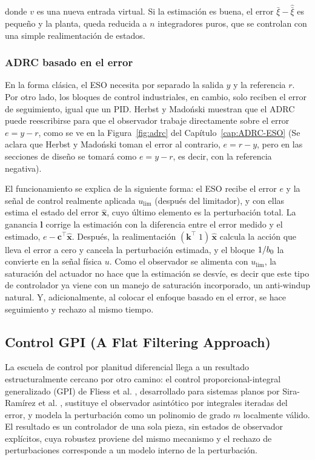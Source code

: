 donde $v$ es una nueva entrada virtual. Si la estimación es buena, el error
$\bar{\xi}-\hat{\bar{\xi}}$ es pequeño y la planta, queda reducida a
$n$ integradores puros, que se controlan con una simple realimentación de
estados.

\subsubsection*{ADRC basado en el error}

En la forma clásica, el ESO necesita por separado la salida $y$ y la
referencia $r$. Por otro lado, los bloques de control industriales, en cambio, solo
reciben el error de seguimiento, igual que un PID. Herbst y Madoński
\cite{herbst2024adrc} muestran que el ADRC puede reescribirse para que el
observador trabaje directamente sobre el error $e = y - r$, como se ve en la
Figura~\ref{fig:adrc} del Capítulo~\ref{cap:ADRC-ESO} (Se aclara que Herbst y Madoński toman el error al contrario, $e = r - y$, pero en las secciones de diseño se tomará como $e = y - r$, es decir, con la referencia negativa).

El funcionamiento se explica de la siguiente forma: el ESO recibe el error $e$ y la señal de control
realmente aplicada $u_{\text{lim}}$ (después del limitador), y con ellas
estima el estado del error $\hat{\boldsymbol{x}}$, cuyo último elemento es la
perturbación total. La ganancia $\boldsymbol{l}$ corrige la estimación con la
diferencia entre el error medido y el estimado, $e - \boldsymbol{c}^{\top}
\hat{\boldsymbol{x}}$. Después, la realimentación
$(\boldsymbol{k}^{\top}\;1)\,\hat{\boldsymbol{x}}$ calcula la acción que lleva
el error a cero y cancela la perturbación estimada, y el bloque $1/b_{0}$ la
convierte en la señal física $u$. Como el observador se alimenta con
$u_{\text{lim}}$, la saturación del actuador no hace que la estimación se
desvíe, es decir que este tipo de controlador ya viene con un manejo de saturación incorporado, un anti-windup natural. Y, adicionalmente, al colocar el enfoque
basado en el error, se hace seguimiento y rechazo al mismo tiempo.

\subsection{Control GPI (A Flat Filtering Approach)}

La escuela de control por planitud diferencial llega a un resultado
estructuralmente cercano por otro camino: el control proporcional-integral
generalizado (GPI) de Fliess et al. \cite{fliess2002gpi}, desarrollado para
sistemas planos por Sira-Ramírez et al. \cite{sira2017adrc}, sustituye el
observador asintótico por integrales iteradas del error, y modela la
perturbación como un polinomio de grado $m$ localmente válido. El resultado es
un controlador de una sola pieza, sin estados de observador explícitos, cuya
robustez proviene del mismo mecanismo y el rechazo de perturbaciones corresponde
a un modelo interno de la perturbación.

